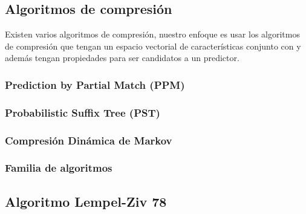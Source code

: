 \uncm
\subsection{Algoritmos de compresión}

Existen varios algoritmos de compresión, nuestro enfoque es usar los algoritmos de compresión que tengan un espacio vectorial de características conjunto con \machinelearning y además tengan propiedades para ser candidatos a un predictor. 


\subsubsection{Prediction by Partial Match (PPM)}

 
\subsubsection{Probabilistic Suffix Tree (PST)}


\subsubsection{Compresión Dinámica de Markov}


\subsubsection{Familia de algoritmos \lempelziv}\label{ch2:sec-lzfamily}

\uncm
\subsection{Algoritmo Lempel-Ziv 78}
















